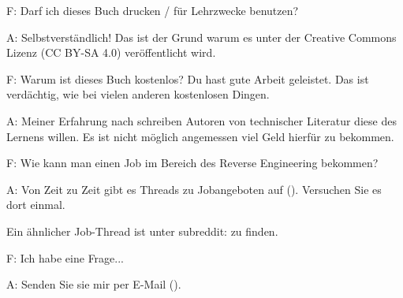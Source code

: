 \par F: Darf ich dieses Buch drucken / für Lehrzwecke benutzen?
\par A: Selbstverständlich! Das ist der Grund warum es unter der Creative Commons Lizenz (CC BY-SA 4.0) veröffentlicht wird.

\par F: Warum ist dieses Buch kostenlos? Du hast gute Arbeit geleistet. Das ist verdächtig, wie bei vielen anderen kostenlosen Dingen.
\par A: Meiner Erfahrung nach schreiben Autoren von technischer Literatur diese des Lernens willen. Es ist nicht möglich angemessen
viel Geld hierfür zu bekommen.

\par F: Wie kann man einen Job im Bereich des Reverse Engineering bekommen?
\par A: Von Zeit zu Zeit gibt es Threads zu Jobangeboten auf \FNURLREDDIT{}
(\RedditHiringThread{}).
Versuchen Sie es dort einmal.

Ein ähnlicher Job-Thread ist unter subreddit: \NetsecHiringThread{} zu finden.

\par F: Ich habe eine Frage...
\par A: Senden Sie sie mir per E-Mail (\EMAIL).
